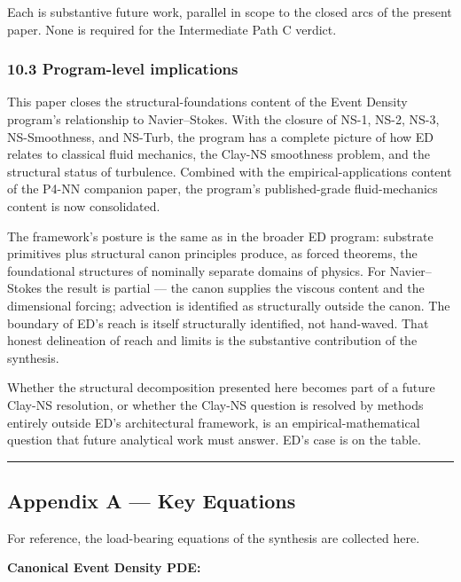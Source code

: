 \documentclass[
  11pt,a4paper]{article}
\begin{document}
Each is substantive future work, parallel in scope to the closed arcs of
the present paper. None is required for the Intermediate Path C verdict.

\subsubsection{10.3 Program-level
implications}\label{program-level-implications}

This paper closes the structural-foundations content of the Event
Density program's relationship to Navier--Stokes. With the closure of
NS-1, NS-2, NS-3, NS-Smoothness, and NS-Turb, the program has a complete
picture of how ED relates to classical fluid mechanics, the Clay-NS
smoothness problem, and the structural status of turbulence. Combined
with the empirical-applications content of the P4-NN companion paper,
the program's published-grade fluid-mechanics content is now
consolidated.

The framework's posture is the same as in the broader ED program:
substrate primitives plus structural canon principles produce, as forced
theorems, the foundational structures of nominally separate domains of
physics. For Navier--Stokes the result is partial --- the canon supplies
the viscous content and the dimensional forcing; advection is identified
as structurally outside the canon. The boundary of ED's reach is itself
structurally identified, not hand-waved. That honest delineation of
reach and limits is the substantive contribution of the synthesis.

Whether the structural decomposition presented here becomes part of a
future Clay-NS resolution, or whether the Clay-NS question is resolved
by methods entirely outside ED's architectural framework, is an
empirical-mathematical question that future analytical work must answer.
ED's case is on the table.

\begin{center}\rule{0.5\linewidth}{0.5pt}\end{center}

\subsection{Appendix A --- Key
Equations}\label{appendix-a-key-equations}

For reference, the load-bearing equations of the synthesis are collected
here.

\textbf{Canonical Event Density PDE:}
\end{document}
